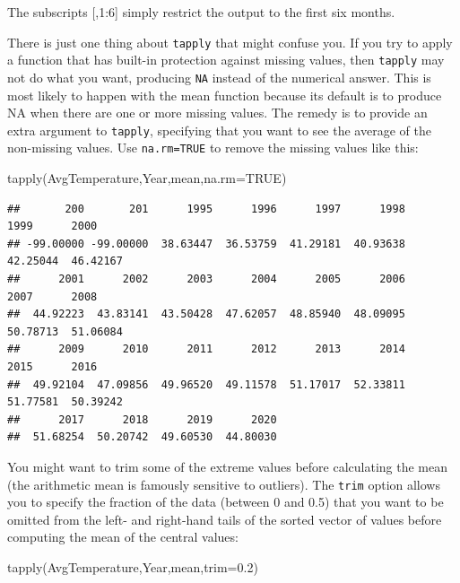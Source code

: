 \documentclass[
]{book}
\newenvironment{Shaded}{\begin{snugshade}}{\end{snugshade}}
\newcommand{\AttributeTok}[1]{\textcolor[rgb]{0.77,0.63,0.00}{#1}}
\newcommand{\ConstantTok}[1]{\textcolor[rgb]{0.00,0.00,0.00}{#1}}
\newcommand{\FloatTok}[1]{\textcolor[rgb]{0.00,0.00,0.81}{#1}}
\newcommand{\FunctionTok}[1]{\textcolor[rgb]{0.00,0.00,0.00}{#1}}
\newcommand{\NormalTok}[1]{#1}
\theoremstyle{definition}
\theoremstyle{definition}
\theoremstyle{definition}
\theoremstyle{definition}
\theoremstyle{remark}
\begin{document}
The subscripts {[},1:6{]} simply restrict the output to the first six months.

There is just one thing about \texttt{tapply} that might confuse you. If you try to apply a function that has built-in protection against missing values, then \texttt{tapply} may not do what you want, producing \texttt{NA} instead of the numerical answer. This is most likely to happen with the mean function because its default is to produce NA when there are one or more missing values. The remedy is to provide an extra argument to \texttt{tapply}, specifying that you want to see the average of the non-missing values. Use \texttt{na.rm=TRUE} to remove the missing values like this:

\begin{Shaded}
\begin{Highlighting}[]
\FunctionTok{tapply}\NormalTok{(AvgTemperature,Year,mean,}\AttributeTok{na.rm=}\ConstantTok{TRUE}\NormalTok{)}
\end{Highlighting}
\end{Shaded}

\begin{verbatim}
##       200       201      1995      1996      1997      1998      1999      2000 
## -99.00000 -99.00000  38.63447  36.53759  41.29181  40.93638  42.25044  46.42167 
##      2001      2002      2003      2004      2005      2006      2007      2008 
##  44.92223  43.83141  43.50428  47.62057  48.85940  48.09095  50.78713  51.06084 
##      2009      2010      2011      2012      2013      2014      2015      2016 
##  49.92104  47.09856  49.96520  49.11578  51.17017  52.33811  51.77581  50.39242 
##      2017      2018      2019      2020 
##  51.68254  50.20742  49.60530  44.80030
\end{verbatim}

You might want to trim some of the extreme values before calculating the mean (the arithmetic mean is famously sensitive to outliers). The \texttt{trim} option allows you to specify the fraction of the data (between 0 and 0.5) that you want to be omitted from the left- and right-hand tails of the sorted vector of values before computing the mean of the central values:

\begin{Shaded}
\begin{Highlighting}[]
\FunctionTok{tapply}\NormalTok{(AvgTemperature,Year,mean,}\AttributeTok{trim=}\FloatTok{0.2}\NormalTok{)}
\end{Highlighting}
\end{Shaded}
\end{document}
